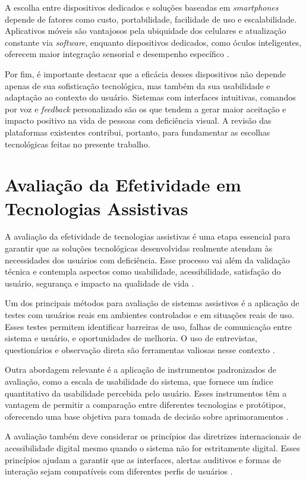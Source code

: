 A escolha entre dispositivos dedicados e soluções baseadas em \textit{smartphones} depende de fatores como custo, portabilidade, facilidade de uso e escalabilidade. Aplicativos móveis são vantajosos pela ubiquidade dos celulares e atualização constante via \textit{software}, enquanto dispositivos dedicados, como óculos inteligentes, oferecem maior integração sensorial e desempenho específico \cite{Saeedi2021}.

Por fim, é importante destacar que a eficácia desses dispositivos não depende apenas de sua sofisticação tecnológica, mas também da sua usabilidade e adaptação ao contexto do usuário. Sistemas com interfaces intuitivas, comandos por voz e \textit{feedback} personalizado são os que tendem a gerar maior aceitação e impacto positivo na vida de pessoas com deficiência visual. A revisão das plataformas existentes contribui, portanto, para fundamentar as escolhas tecnológicas feitas no presente trabalho.

\section{Avaliação da Efetividade em Tecnologias Assistivas}
A avaliação da efetividade de tecnologias assistivas é uma etapa essencial para garantir que as soluções tecnológicas desenvolvidas realmente atendam às necessidades dos usuários com deficiência. Esse processo vai além da validação técnica e contempla aspectos como usabilidade, acessibilidade, satisfação do usuário, segurança e impacto na qualidade de vida \cite{Wentz2013}.

Um dos principais métodos para avaliação de sistemas assistivos é a aplicação de testes com usuários reais em ambientes controlados e em situações reais de uso. Esses testes permitem identificar barreiras de uso, falhas de comunicação entre sistema e usuário, e oportunidades de melhoria. O uso de entrevistas, questionários e observação direta são ferramentas valiosas nesse contexto \cite{Kintsch2002}.

Outra abordagem relevante é a aplicação de instrumentos padronizados de avaliação, como a escala de usabilidade do sistema, que fornece um índice quantitativo da usabilidade percebida pelo usuário. Esses instrumentos têm a vantagem de permitir a comparação entre diferentes tecnologias e protótipos, oferecendo uma base objetiva para tomada de decisão sobre aprimoramentos \cite{Brooke1996}.

A avaliação também deve considerar os princípios das diretrizes internacionais de acessibilidade digital mesmo quando o sistema não for estritamente digital. Esses princípios ajudam a garantir que as interfaces, alertas auditivos e formas de interação sejam compatíveis com diferentes perfis de usuários \cite{W3C2023}.


